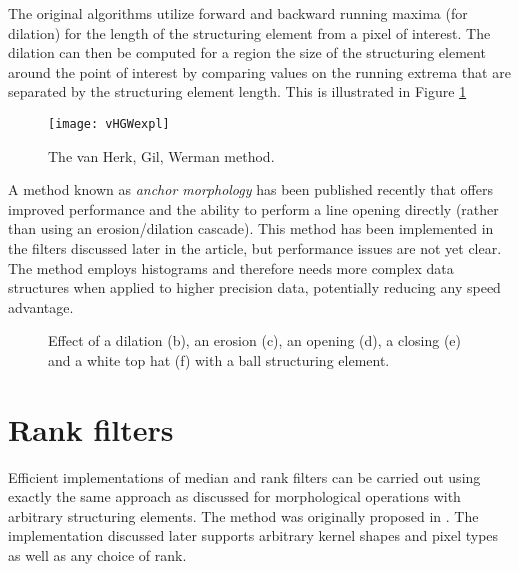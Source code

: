 \documentclass[a4paper]{InsightArticle}
\begin{document}
The original algorithms utilize forward and backward running maxima
(for dilation) for the length of the structuring element from a pixel
of interest. The dilation can then be computed for a region the size
of the structuring element around the point of interest by comparing
values on the running extrema that are separated by the structuring
element length. This is illustrated in Figure \ref{fig:vHGWmethod}

\begin{figure}[htbp]
\centering
\texttt{[image: vHGWexpl]}
\caption{The van Herk, Gil, Werman method.\label{fig:vHGWmethod}}
\end{figure}

A method known as {\em anchor morphology} has been published recently
\cite{Vandroogenbroeck2005Morphological} that offers improved
performance and the ability to perform a line opening directly (rather
than using an erosion/dilation cascade). This method has been
implemented in the filters discussed later in the article, but
performance issues are not yet clear. The method employs histograms
and therefore needs more complex data structures when applied to
higher precision data, potentially reducing any speed advantage.

\begin{figure}[htbp]
\begin{center}
\caption{Effect of a dilation (b), an erosion (c), an opening (d),
a closing (e) and a white top hat (f) with a ball structuring element.}
\end{center}
\end{figure}


\section{Rank filters}
\label{sect:rank}
Efficient implementations of median and rank filters can be carried out
using exactly the same approach as discussed for morphological
operations with arbitrary structuring elements. The method was
originally proposed in \cite{Huang79}. The implementation discussed
later supports arbitrary kernel shapes and pixel types as well as any
choice of rank.
\end{document}
